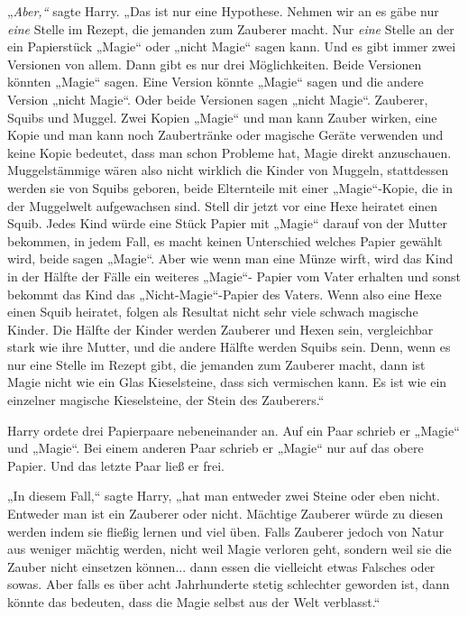 {„\emph{Aber,“} sagte Harry. „Das ist nur eine Hypothese. Nehmen wir an es gäbe nur \emph{eine} Stelle im Rezept, die jemanden zum Zauberer macht. Nur \emph{eine} Stelle an der ein Papierstück „Magie“ oder „nicht Magie“ sagen kann. Und es gibt immer zwei Versionen von allem. Dann gibt es nur drei Möglichkeiten. Beide Versionen könnten „Magie“ sagen. Eine Version könnte „Magie“ sagen und die andere Version „nicht Magie“. Oder beide Versionen sagen „nicht Magie“. Zauberer, Squibs und Muggel. Zwei Kopien „Magie“ und man kann Zauber wirken, eine Kopie und man kann noch Zaubertränke oder magische Geräte verwenden und keine Kopie bedeutet, dass man schon Probleme hat, Magie direkt anzuschauen. Muggelstämmige wären also nicht wirklich die Kinder von Muggeln, stattdessen werden sie von Squibs geboren, beide Elternteile mit einer „Magie“-Kopie, die in der Muggelwelt aufgewachsen sind. Stell dir jetzt vor eine Hexe heiratet einen Squib. Jedes Kind würde eine Stück Papier mit „Magie“ darauf von der Mutter bekommen, in jedem Fall, es macht keinen Unterschied welches Papier gewählt wird, beide sagen „Magie“. Aber wie wenn man eine Münze wirft, wird das Kind in der Hälfte der Fälle ein weiteres „Magie“- Papier vom Vater erhalten und sonst bekommt das Kind das „Nicht-Magie“-Papier des Vaters. Wenn also eine Hexe einen Squib heiratet, folgen als Resultat nicht sehr viele schwach magische Kinder. Die Hälfte der Kinder werden Zauberer und Hexen sein, vergleichbar stark wie ihre Mutter, und die andere Hälfte werden Squibs sein. Denn, wenn es nur eine Stelle im Rezept gibt, die jemanden zum Zauberer macht, dann ist Magie nicht wie ein Glas Kieselsteine, dass sich vermischen kann. Es ist wie ein einzelner magische Kieselsteine, der Stein des Zauberers.“

Harry ordete drei Papierpaare nebeneinander an. Auf ein Paar schrieb er „Magie“ und „Magie“. Bei einem anderen Paar schrieb er „Magie“ nur auf das obere Papier. Und das letzte Paar ließ er frei.

„In diesem Fall,“ sagte Harry, „hat man entweder zwei Steine oder eben nicht. Entweder man ist ein Zauberer oder nicht. Mächtige Zauberer würde zu diesen werden indem sie fließig lernen und viel üben. Falls Zauberer jedoch von Natur aus weniger mächtig werden, nicht weil Magie verloren geht, sondern weil sie die Zauber nicht einsetzen können... dann essen die vielleicht etwas Falsches oder sowas. Aber falls es über acht Jahrhunderte stetig schlechter geworden ist, dann könnte das bedeuten, dass die Magie selbst aus der Welt verblasst.“

}
